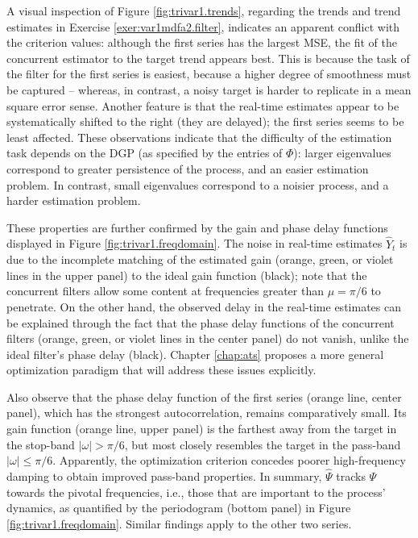 \documentclass[a4paper]{book}
\begin{document}
A visual inspection of Figure \ref{fig:trivar1.trends}, regarding
the trends and trend estimates in Exercise 
 \ref{exer:var1mdfa2.filter}, indicates an apparent conflict with the 
 criterion values: although the first series has the largest MSE,
 the fit of the concurrent estimator to the target trend appears best.
 This is because the task of the filter for the first series is
 easiest, because a higher degree of smoothness must be captured --
 whereas, in contrast, a noisy target is harder to replicate in a
 mean square error sense. Another feature is that the real-time
 estimates appear  to be systematically 
shifted to the right (they are delayed); the first series seems to be least
 affected.   These observations indicate that the difficulty of the estimation 
  task  depends on the DGP (as specified by the entries of $\Phi$):
 larger eigenvalues correspond to greater persistence of the process, 
  and an easier estimation problem.  In contrast, small eigenvalues 
 correspond to a noisier process, and a harder estimation problem.
 
 These properties are further confirmed by the gain and phase delay
 functions displayed   in Figure \ref{fig:trivar1.freqdomain}.   
 The noise  in real-time estimates $\widehat{Y}_t$  
 is due to the incomplete matching of the estimated gain (orange, green, or
 violet lines in the upper panel) to the ideal gain function (black); 
  note that the concurrent
 filters allow some   content at frequencies greater than $\mu = \pi/6$
 to penetrate.  On the other hand, the observed delay in the real-time
 estimates can be explained through the fact that the phase delay functions
 of the concurrent filters (orange, green, or
 violet lines in the center panel) do not vanish, unlike the ideal
 filter's phase delay (black).    Chapter \ref{chap:ats} 
proposes a more general optimization paradigm that will address these issues 
explicitly.

 Also observe that the phase delay function of the first series
 (orange line, center panel), which has the strongest autocorrelation,
  remains comparatively small. Its gain function (orange line, upper panel) 
 is the farthest away from the target in the stop-band $|\omega| >\pi/6$,
   but most closely resembles the target in the pass-band 
	$|\omega| \leq\pi/6$.
  Apparently,  the optimization criterion concedes
 poorer high-frequency damping to obtain improved pass-band properties. 
 In summary, $\widehat{\Psi}$ tracks $\Psi$ towards the pivotal
 frequencies, i.e., those that are important to the process'
 dynamics, as quantified by the periodogram (bottom panel) in 
 Figure \ref{fig:trivar1.freqdomain}.  
Similar findings apply to the other two series.
\end{document}
